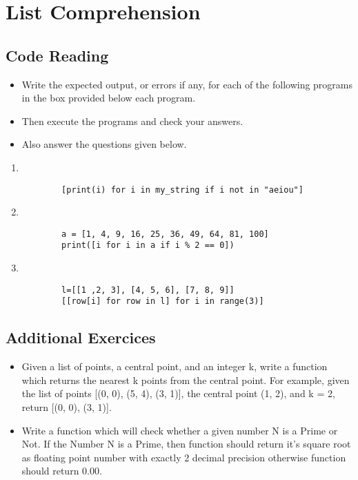 \documentclass[11pt,a4paper]{article}
\def\AnswerBox{\fbox{\begin{minipage}{4in}\hfill\vspace{0.5in}\end{minipage}}}
\begin{document}
\section*{List Comprehension}

\subsection*{Code Reading}

\begin{itemize}
    \item Write the expected output, or errors if any, for each of the following programs in the box provided below each program.
    \item Then execute the programs and check your answers.
    \item Also answer the questions given below.
\end{itemize}

\begin{enumerate}[label=\bfseries Program \arabic*:]

    \item ~
    \begin{lstlisting}
        [print(i) for i in my_string if i not in "aeiou"]
    \end{lstlisting}
    \AnswerBox
    \item ~
    \begin{lstlisting}
        a = [1, 4, 9, 16, 25, 36, 49, 64, 81, 100]
        print([i for i in a if i % 2 == 0])
    \end{lstlisting}
    \AnswerBox
    \item ~
    \begin{lstlisting}
        l=[[1 ,2, 3], [4, 5, 6], [7, 8, 9]]
        [[row[i] for row in l] for i in range(3)]
    \end{lstlisting}
    \AnswerBox
\end{enumerate}
\subsection*{Additional Exercices}
\begin{itemize}
    \item Given a list of points, a central point, and an integer k, write a function which returns the nearest k points from the central point. For example, given the list of points [(0, 0), (5, 4), (3, 1)], the central point (1, 2), and k = 2, return [(0, 0), (3, 1)].
    \item Write a function which will check whether a given number N is a Prime or Not. If the Number N is a Prime, then function should return it’s square root as floating point number with exactly 2 decimal precision otherwise function should return 0.00.
\end{itemize}
\end{document}
